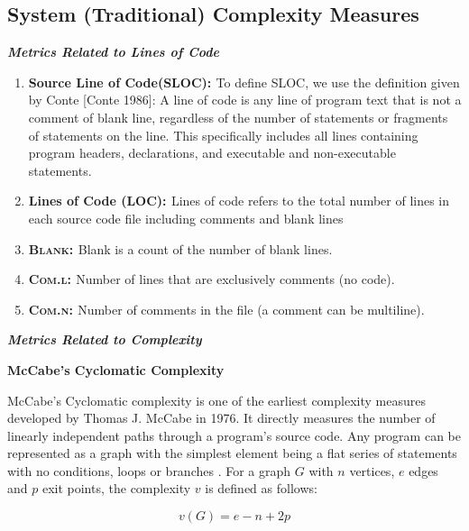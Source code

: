 \documentclass[9pt,twocolumn,a4paper]{article}
\begin{document}
\subsection{System (Traditional) Complexity Measures}
{\bf{\emph{Metrics Related to Lines of Code}}}
\newline
\begin{enumerate}

\item{\bf{Source Line of Code(SLOC): }} To define SLOC, we use the definition given by Conte [Conte 1986]: A line of code is any line of program text that is not a comment of blank line, regardless of the number of statements or fragments of statements on the line. This specifically includes all lines containing program headers, declarations, and executable and non-executable statements.

\item{\bf{Lines of Code (LOC): }} Lines of code refers to the total number of lines in each source code file including comments and blank lines


\item{\bf{\textsc{Blank: }}}Blank is a count of the number of blank lines.

\item{\bf{\textsc{Com.l: }}}Number of lines that are exclusively comments (no code).

\item{\bf{\textsc{Com.n: }}} Number of comments in the file (a comment can be multiline).
\end{enumerate}


{\bf{\emph{Metrics Related to Complexity}}}
\newline

{\bf{McCabe's Cyclomatic Complexity}}\newline

McCabe's Cyclomatic complexity is one of the earliest complexity measures developed by Thomas J. McCabe in 1976. It directly measures the number of linearly independent paths through a program's source code. Any program can be represented as a graph with the simplest element being a flat series of statements with no conditions, loops or branches \cite{Israel}. For a graph $G$ with $n$ vertices, $e$ edges and $p$ exit points, the complexity $v$ is defined as follows:

\begin{equation}
v(G)=e-n+2p
\end{equation}
\end{document}
